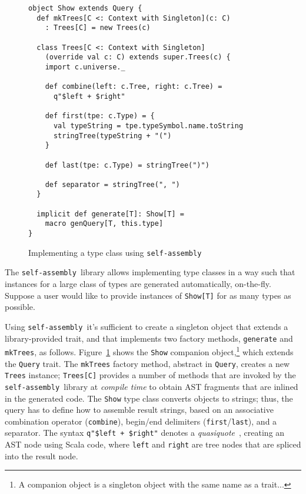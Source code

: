 \documentclass[preprint]{sigplanconf}
\newcommand{\selfassembly}{\texttt{self-assembly~}}
\begin{document}
\begin{figure}
\centering
\begin{lstlisting}
object Show extends Query {
  def mkTrees[C <: Context with Singleton](c: C)
    : Trees[C] = new Trees(c)

  class Trees[C <: Context with Singleton]
    (override val c: C) extends super.Trees(c) {
    import c.universe._

    def combine(left: c.Tree, right: c.Tree) =
      q"$left + $right"

    def first(tpe: c.Type) = {
      val typeString = tpe.typeSymbol.name.toString
      stringTree(typeString + "(")
    }

    def last(tpe: c.Type) = stringTree(")")

    def separator = stringTree(", ")
  }

  implicit def generate[T]: Show[T] =
    macro genQuery[T, this.type]
}
\end{lstlisting}
  \caption{Implementing a type class using \selfassembly}
  \label{fig:basic-usage}
\end{figure}

The \selfassembly library allows implementing type classes in a way such that
instances for a large class of types are generated automatically, on-the-fly.
Suppose a user would like to provide instances of \verb|Show[T]| for as many
types as possible.

Using \selfassembly it's sufficient to create a singleton
object that extends a library-provided trait, and that implements two factory
methods, \verb|generate| and \verb|mkTrees|, as follows.
Figure~\ref{fig:basic-usage} shows the \verb|Show| companion object,\footnote{A companion
object is a singleton object with the same name as a trait...} which extends
the \verb|Query| trait. The \verb|mkTrees| factory method, abstract in \verb|Query|,
creates a new \verb|Trees| instance; \verb|Trees[C]| provides a number of methods that
are invoked by the \selfassembly library at \emph{compile time} to obtain AST fragments that are
inlined in the generated code. The \verb|Show| type class converts objects to
strings; thus, the query has to define how to assemble result strings, based
on an associative combination operator (\verb|combine|), begin/end delimiters
(\verb|first|/\verb|last|), and a separator. The syntax
\verb|q"$left + $right"| denotes a \emph{quasiquote}~\cite{Quasiquotes},
creating an AST node using Scala code, where \verb|left| and \verb|right|
are tree nodes that are spliced into the result node.
\end{document}
